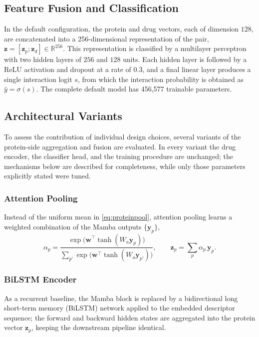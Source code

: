 \documentclass[conference]{IEEEtran}
\begin{document}
\subsection{Feature Fusion and Classification}
In the default configuration, the protein and drug vectors, each of dimension
$128$, are concatenated into a 256-dimensional representation of the pair,
$\mathbf{z} = [\mathbf{z}_{p}; \mathbf{z}_{d}] \in \mathbb{R}^{256}$. This
representation is classified by a multilayer perceptron with two hidden layers
of $256$ and $128$ units. Each hidden layer is followed by a ReLU activation and
dropout at a rate of $0.3$, and a final linear layer produces a single
interaction logit $s$, from which the interaction probability is obtained as
$\hat{y} = \sigma(s)$. The complete default model has 456{,}577 trainable
parameters.

\subsection{Architectural Variants}
\label{sec:variants}
To assess the contribution of individual design choices, several variants of
the protein-side aggregation and fusion are evaluated. In every variant the
drug encoder, the classifier head, and the training procedure are unchanged; the
mechanisms below are described for completeness, while only those parameters
explicitly stated were tuned.

\subsubsection{Attention Pooling}
Instead of the uniform mean in \eqref{eq:proteinpool}, attention pooling learns
a weighted combination of the Mamba outputs $\{\mathbf{y}_{p}\}$,
\begin{equation}
\alpha_{p} = \frac{\exp\!\bigl(\mathbf{w}^{\top}
\tanh(W_{a}\mathbf{y}_{p})\bigr)}
{\sum_{p'} \exp\!\bigl(\mathbf{w}^{\top}\tanh(W_{a}\mathbf{y}_{p'})\bigr)},
\qquad
\mathbf{z}_{p} = \sum_{p} \alpha_{p}\,\mathbf{y}_{p}.
\label{eq:attnpool}
\end{equation}

\subsubsection{BiLSTM Encoder}
As a recurrent baseline, the Mamba block is replaced by a bidirectional long
short-term memory (BiLSTM) network \cite{ref_lstm} applied to the embedded
descriptor sequence; the forward and backward hidden states are aggregated into
the protein vector $\mathbf{z}_{p}$, keeping the downstream pipeline identical.
\end{document}
